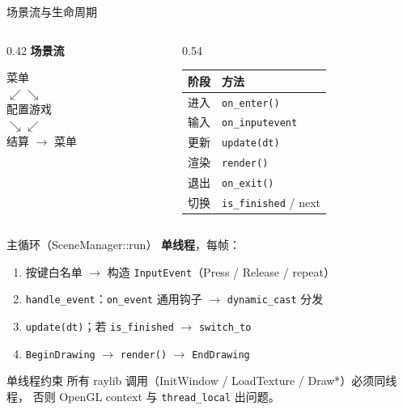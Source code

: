 \documentclass[aspectratio=169,13pt]{beamer}
\begin{document}
\begin{frame}{场景流与生命周期}
  \begin{columns}[T]
    \begin{column}{0.42\textwidth}
      \textbf{场景流}
      \begin{center}
        菜单 \\[0.2em]
        $\swarrow$\quad$\searrow$ \\[0.2em]
        配置\quad 游戏 \\[0.2em]
        $\searrow$\quad$\swarrow$ \\[0.2em]
        结算 $\rightarrow$ 菜单
      \end{center}
    \end{column}
    \begin{column}{0.54\textwidth}
      \footnotesize
      \begin{tabular}{@{}ll@{}}
        \toprule
        阶段 & 方法 \\
        \midrule
        进入 & \texttt{on\_enter()} \\
        输入 & \texttt{on\_inputevent} \\
        更新 & \texttt{update(dt)} \\
        渲染 & \texttt{render()} \\
        退出 & \texttt{on\_exit()} \\
        切换 & \texttt{is\_finished} / next \\
        \bottomrule
      \end{tabular}
    \end{column}
  \end{columns}
\end{frame}

\begin{frame}{主循环（SceneManager::run）}
  \textbf{单线程}，每帧：
  \begin{enumerate}
    \item 按键白名单 $\rightarrow$ 构造 \texttt{InputEvent}（Press / Release / repeat）
    \item \texttt{handle\_event}：\texttt{on\_event} 通用钩子 $\rightarrow$ \texttt{dynamic\_cast} 分发
    \item \texttt{update(dt)}；若 \texttt{is\_finished} $\rightarrow$ \texttt{switch\_to}
    \item \texttt{BeginDrawing} $\rightarrow$ \texttt{render()} $\rightarrow$ \texttt{EndDrawing}
  \end{enumerate}

  \vspace{0.3em}
  \begin{alertblock}{单线程约束}
    所有 raylib 调用（InitWindow / LoadTexture / Draw*）必须同线程，
    否则 OpenGL context 与 \texttt{thread\_local} 出问题。
  \end{alertblock}
\end{frame}
\end{document}
